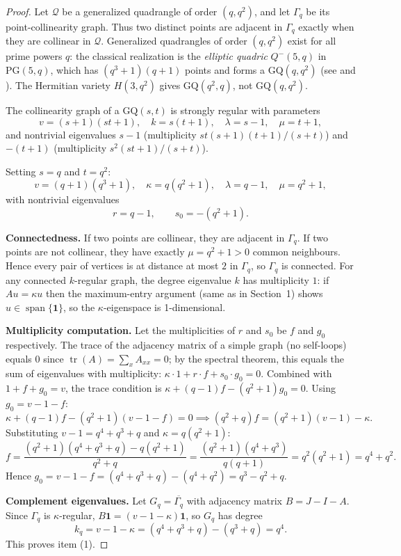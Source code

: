 \begin{proof}
Let $\mathcal{Q}$ be a generalized quadrangle of order $(q,q^2)$, and let $\Gamma_q$ be its point-collinearity graph. Thus two distinct points are adjacent in $\Gamma_q$ exactly when they are collinear in $\mathcal{Q}$. Generalized quadrangles of order $(q,q^2)$ exist for all prime powers $q$: the classical realization is the \emph{elliptic quadric} $Q^-(5,q)$ in $\mathrm{PG}(5,q)$, which has $(q^3+1)(q+1)$ points and forms a $\mathrm{GQ}(q,q^2)$ (see \cite{PT1984} and \cite{BvM2022}). The Hermitian variety $H(3,q^2)$ gives $\mathrm{GQ}(q^2,q)$, not $\mathrm{GQ}(q,q^2)$.

The collinearity graph of a $\mathrm{GQ}(s,t)$ is strongly regular with parameters \cite{PT1984}
\[
v=(s+1)(st+1),\quad k=s(t+1),\quad \lambda=s-1,\quad \mu=t+1,
\]
and nontrivial eigenvalues $s-1$ (multiplicity $st(s+1)(t+1)/(s+t)$) and $-(t+1)$ (multiplicity $s^2(st+1)/(s+t)$).

Setting $s=q$ and $t=q^2$:
\[
v=(q+1)(q^3+1),\quad \kappa=q(q^2+1),\quad \lambda=q-1,\quad \mu=q^2+1,
\]
with nontrivial eigenvalues
\[
r=q-1,\qquad s_0=-(q^2+1).
\]

\textbf{Connectedness.} If two points are collinear, they are adjacent in $\Gamma_q$. If two points are not collinear, they have exactly $\mu=q^2+1>0$ common neighbours. Hence every pair of vertices is at distance at most $2$ in $\Gamma_q$, so $\Gamma_q$ is connected. For any connected $k$-regular graph, the degree eigenvalue $k$ has multiplicity $1$: if $Au=\kappa u$ then the maximum-entry argument (same as in Section~1) shows $u\in\operatorname{span}\{\mathbf{1}\}$, so the $\kappa$-eigenspace is 1-dimensional.

\textbf{Multiplicity computation.} Let the multiplicities of $r$ and $s_0$ be $f$ and $g_0$ respectively. The trace of the adjacency matrix of a simple graph (no self-loops) equals $0$ since $\operatorname{tr}(A)=\sum_x A_{xx}=0$; by the spectral theorem, this equals the sum of eigenvalues with multiplicity: $\kappa\cdot 1 + r\cdot f + s_0\cdot g_0 = 0$. Combined with $1+f+g_0=v$, the trace condition is $\kappa+(q-1)f-(q^2+1)g_0=0$. Using $g_0=v-1-f$:
\[
\kappa+(q-1)f-(q^2+1)(v-1-f)=0 \implies (q^2+q)f=(q^2+1)(v-1)-\kappa.
\]
Substituting $v-1=q^4+q^3+q$ and $\kappa=q(q^2+1)$:
\[
f=\frac{(q^2+1)(q^4+q^3+q)-q(q^2+1)}{q^2+q}
=\frac{(q^2+1)(q^4+q^3)}{q(q+1)}
=q^2(q^2+1)=q^4+q^2.
\]
Hence $g_0=v-1-f=(q^4+q^3+q)-(q^4+q^2)=q^3-q^2+q$.

\textbf{Complement eigenvalues.} Let $G_q=\overline{\Gamma_q}$ with adjacency matrix $B=J-I-A$. Since $\Gamma_q$ is $\kappa$-regular, $B\mathbf{1}=(v-1-\kappa)\mathbf{1}$, so $G_q$ has degree
\[
k_q=v-1-\kappa=(q^4+q^3+q)-(q^3+q)=q^4.
\]
This proves item (1).


\end{proof}
